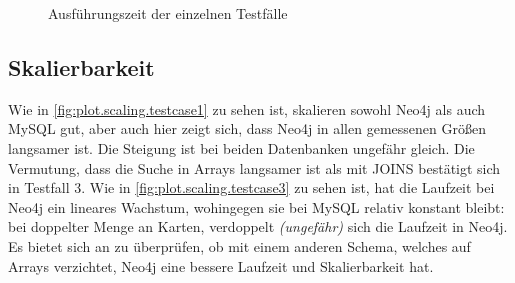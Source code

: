 \begin{figure}[t]
    \myfloatalign
    \caption{Ausführungszeit der einzelnen Testfälle}
    \label{fig:plot.runtime}
\end{figure}


\subsection{Skalierbarkeit}
Wie in \autoref{fig:plot.scaling.testcase1} zu sehen ist, skalieren sowohl Neo4j als auch MySQL gut, aber auch hier zeigt sich, dass Neo4j in allen gemessenen Größen langsamer ist. Die Steigung ist bei beiden Datenbanken ungefähr gleich. Die Vermutung, dass die Suche in Arrays langsamer ist als mit JOINS bestätigt sich in Testfall 3. Wie in  \autoref{fig:plot.scaling.testcase3} zu sehen ist, hat die Laufzeit bei Neo4j ein lineares Wachstum, wohingegen sie bei MySQL relativ konstant bleibt: bei doppelter Menge an Karten, verdoppelt \emph{(ungefähr)} sich die Laufzeit in Neo4j. Es bietet sich an zu überprüfen, ob mit einem anderen Schema, welches auf Arrays verzichtet, Neo4j eine bessere Laufzeit und Skalierbarkeit hat.

